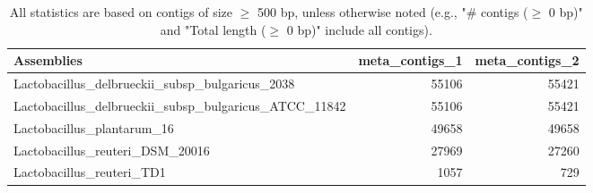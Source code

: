 \documentclass[12pt,a4paper]{article}
\begin{document}
\begin{table}[ht]
\begin{center}
\caption{All statistics are based on contigs of size $\geq$ 500 bp, unless otherwise noted (e.g., "\# contigs ($\geq$ 0 bp)" and "Total length ($\geq$ 0 bp)" include all contigs).}
\begin{tabular}{|l*{2}{|r}|}
\hline
Assemblies & meta\_contigs\_1 & meta\_contigs\_2 \\ \hline
Lactobacillus\_delbrueckii\_subsp\_bulgaricus\_2038 & 55106 & 55421 \\ \hline
Lactobacillus\_delbrueckii\_subsp\_bulgaricus\_ATCC\_11842 & 55106 & 55421 \\ \hline
Lactobacillus\_plantarum\_16 & 49658 & 49658 \\ \hline
Lactobacillus\_reuteri\_DSM\_20016 & 27969 & 27260 \\ \hline
Lactobacillus\_reuteri\_TD1 & 1057 & 729 \\ \hline
\end{tabular}
\end{center}
\end{table}
\end{document}

